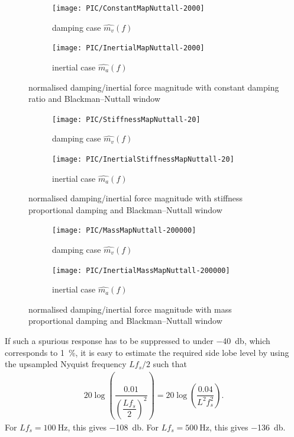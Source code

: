 \begin{figure}[htb!]
\centering
\begin{subfigure}{.48\textwidth}
\texttt{[image: PIC/ConstantMapNuttall-2000]}
\caption{damping case $\hat{m_v}\left(f\right)$}
\end{subfigure}
\begin{subfigure}{.48\textwidth}
\texttt{[image: PIC/InertialMapNuttall-2000]}
\caption{inertial case $\hat{m_a}\left(f\right)$}
\end{subfigure}
\caption{normalised damping/inertial force magnitude with constant damping ratio and Blackman--Nuttall window}\label{fig:map_constant_nuttall}
\end{figure}
\begin{figure}[htb!]
\centering
\begin{subfigure}{.48\textwidth}
\texttt{[image: PIC/StiffnessMapNuttall-20]}
\caption{damping case $\hat{m_v}\left(f\right)$}
\end{subfigure}
\begin{subfigure}{.48\textwidth}
\texttt{[image: PIC/InertialStiffnessMapNuttall-20]}
\caption{inertial case $\hat{m_a}\left(f\right)$}
\end{subfigure}
\caption{normalised damping/inertial force magnitude with stiffness proportional damping and Blackman--Nuttall window}\label{fig:map_stiffness_nuttall}
\end{figure}
\begin{figure}[htb!]
\centering
\begin{subfigure}{.48\textwidth}
\texttt{[image: PIC/MassMapNuttall-200000]}
\caption{damping case $\hat{m_v}\left(f\right)$}
\end{subfigure}
\begin{subfigure}{.48\textwidth}
\texttt{[image: PIC/InertialMassMapNuttall-200000]}
\caption{inertial case $\hat{m_a}\left(f\right)$}
\end{subfigure}
\caption{normalised damping/inertial force magnitude with mass proportional damping and Blackman--Nuttall window}\label{fig:map_mass_nuttall}
\end{figure}

If such a spurious response has to be suppressed to under \SI{-40}{\decibel}, which corresponds to \SI{1}{\percent}, it is easy to estimate the required side lobe level by using the upsampled Nyquist frequency $Lf_s/2$ such that
\begin{gather}
20\log\left(\dfrac{0.01}{\left(\dfrac{Lf_s}{2}\right)^2}\right)=20\log\left(\dfrac{0.04}{L^2f_s^2}\right).
\end{gather}
For $Lf_s=\SI{100}{\hertz}$, this gives \SI{-108}{\decibel}. For $Lf_s=\SI{500}{\hertz}$, this gives \SI{-136}{\decibel}.
